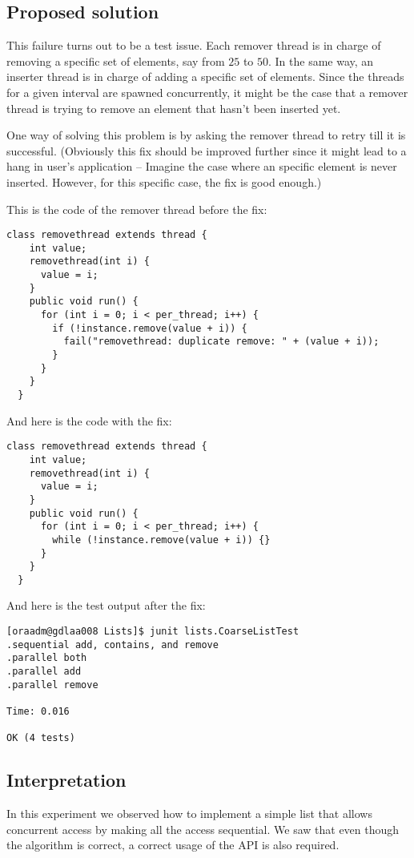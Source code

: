 \subsection{Proposed solution}
\par
This failure turns out to be a test issue. Each remover thread is in charge of
removing a specific set of elements, say from $25$ to $50$. In the same way, an
inserter thread is in charge of adding a specific set of elements. Since the
threads for a given interval are spawned concurrently, it might be the case that
a remover thread is trying to remove an element that hasn't been inserted yet. 
\par
One way of solving this problem is by asking the remover thread to retry till it
is successful. (Obviously this fix should be improved further since it might
lead to a hang in user's application -- Imagine the case where an specific
element is never inserted. However, for this specific case, the fix is good
enough.)
\par
This is the code of the remover thread before the fix:
\par
\hfill
\begin{lstlisting}[style=numbers]
  class removethread extends thread {
    int value;
    removethread(int i) {
      value = i;
    }   
    public void run() {
      for (int i = 0; i < per_thread; i++) {
        if (!instance.remove(value + i)) {
          fail("removethread: duplicate remove: " + (value + i));
        }
      }   
    }   
  }
\end{lstlisting}
\hfill
\par
And here is the code with the fix:
\par
\hfill
\begin{lstlisting}[style=numbers]
  class removethread extends thread {
    int value;
    removethread(int i) {
      value = i;
    }   
    public void run() {
      for (int i = 0; i < per_thread; i++) {
        while (!instance.remove(value + i)) {}
      }   
    }   
  }
\end{lstlisting}
\hfill
\par
And here is the test output after the fix:
\par
\begin{verbatim}
[oraadm@gdlaa008 Lists]$ junit lists.CoarseListTest
.sequential add, contains, and remove
.parallel both
.parallel add
.parallel remove

Time: 0.016

OK (4 tests)
\end{verbatim}
\subsection{Interpretation}
In this experiment we observed how to implement a simple list that allows
concurrent access by making all the access sequential. We saw that even though
the algorithm is correct, a correct usage of the API is also required.
